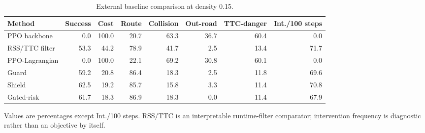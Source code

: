 
\begin{table}[t]
\centering
\caption{External baseline comparison at density 0.15.}
\label{tab_external_baseline}
\scriptsize
\setlength{\tabcolsep}{3.4pt}
\renewcommand{\arraystretch}{1.08}
\begin{tabular}{@{}lrrrrrrr@{}}
\toprule
Method & Success & Cost & Route & Collision & Out-road & TTC-danger & Int./100 steps \\
\midrule
PPO backbone & 0.0 & 100.0 & 20.7 & 63.3 & 36.7 & 60.4 & 0.0 \\
RSS/TTC filter & 53.3 & 44.2 & 78.9 & 41.7 & 2.5 & 13.4 & 71.7 \\
PPO-Lagrangian & 0.0 & 100.0 & 22.1 & 69.2 & 30.8 & 60.1 & 0.0 \\
Guard & 59.2 & 20.8 & 86.4 & 18.3 & 2.5 & 11.8 & 69.6 \\
Shield & 62.5 & 19.2 & 85.7 & 15.8 & 3.3 & 11.4 & 70.8 \\
Gated-risk & 61.7 & 18.3 & 86.9 & 18.3 & 0.0 & 11.4 & 67.9 \\
\bottomrule
\end{tabular}
\begin{tablenotes}
\item Values are percentages except Int./100 steps. RSS/TTC is an interpretable runtime-filter comparator; intervention frequency is diagnostic rather than an objective by itself.
\end{tablenotes}
\end{table}
